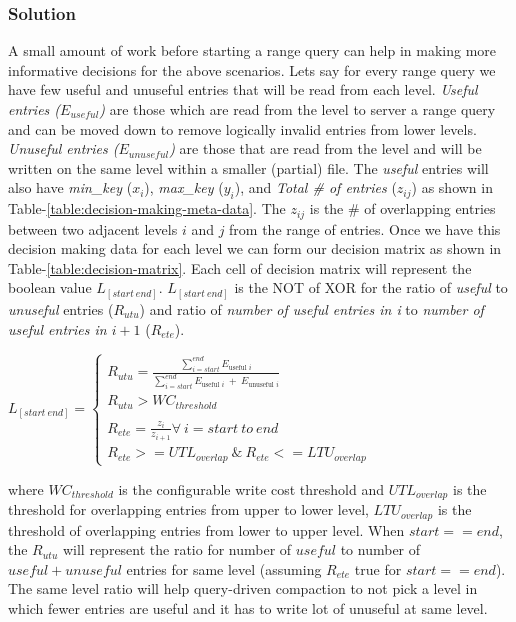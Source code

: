 \subsubsection{Solution}
A small amount of work before starting a range query can help in making more informative decisions for the above 
scenarios. Lets say for every range query we have few useful and unuseful entries that will be read from each level. 
\textit{Useful entries ($E_{useful}$)} are those which are read from the level to server a range query and can be moved down to 
remove logically invalid entries from lower levels. \textit{Unuseful entries ($E_{unuseful}$)} are those that are read 
from the level and will be written on the same level within a smaller (partial) file. The \textit{useful} entries will also 
have \textit{min\_key} (\textit{$x_i$}), \textit{max\_key} (\textit{$y_i$}), and \textit{Total \# of entries} (\textit{$z_{ij}$}) 
as shown in Table-\ref{table:decision-making-meta-data}. The \textit{$z_{ij}$} is the \# of overlapping entries between 
two adjacent levels $i$ and $j$ from the range of entries. Once we have this decision making data for each level we can 
form our decision matrix as shown in Table-\ref{table:decision-matrix}. Each cell of decision matrix will represent the 
boolean value $L_{[start\ end]}$. $L_{[start\ end]}$ is the NOT of XOR for the ratio of \textit{useful} to \textit{unuseful} 
entries ($R_{utu}$) and ratio of \textit{number of useful entries in i} to \textit{number of useful entries in $i+1$} ($R_{ete}$).
\hfill
\begin{center}
\begin{math}
    L_{[start\ end]}=\left\{
      \begin{array}{ll}
        R_{utu} = \frac{\sum_{i=start}^{end} E_{\text{useful }i}}{\sum_{i=start}^{end} {E_{\text{useful }i}\ +\ E_{\text{unuseful }i}}}\\
        R_{utu} > WC_{threshold}\\\\
        R_{ete} = \frac{z_{i}}{z_{i+1}} \forall\ i=start\ to\ end\\
        R_{ete} >= UTL_{overlap}\ \&\ R_{ete} <= LTU_{overlap}
      \end{array}
    \right.
  \end{math}
\end{center}
\hfill \break
where \textit{$WC_{threshold}$} is the configurable write cost threshold and \textit{$UTL_{overlap}$} is the threshold for 
overlapping entries from upper to lower level, \textit{$LTU_{overlap}$} is the threshold of overlapping entries from 
lower to upper level. When $start == end$, the \textit{$R_{utu}$} will represent the ratio for number of $useful$ to 
number of $useful + unuseful$ entries for same level (assuming \textit{$R_{ete}$} true for $start == end$). The same level ratio will help query-driven compaction to not pick 
a level in which fewer entries are useful and it has to write lot of unuseful at same level.


